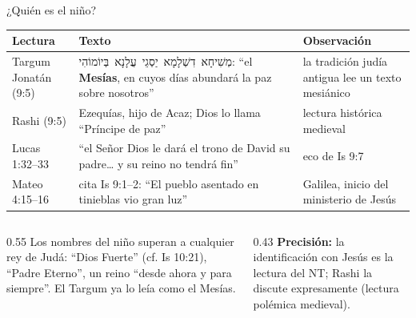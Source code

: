 \documentclass[hyperref={bookmarks=false},aspectratio=169]{beamer}
\newcommand{\heb}[1]{\mbox{\foreignlanguage{hebrew}{#1}}}
\newcommand{\destacar}[1]{\textbf{\textcolor{azul}{#1}}}
\newcommand{\precision}[1]{{\footnotesize\color{gris}\textbf{Precisión:} #1}}
\begin{document}
\begin{frame}{¿Quién es el niño?}
\scriptsize\renewcommand{\arraystretch}{1.2}
\begin{tabular}{@{}>{\RaggedRight\arraybackslash}p{2.6cm}>{\RaggedRight\arraybackslash}p{5.2cm}>{\RaggedRight\arraybackslash}p{4.0cm}@{}}
\toprule
\textbf{Lectura} & \textbf{Texto} & \textbf{Observación} \\ \midrule
Targum Jonatán (9:5) & \heb{מְשִׁיחָא דִשְׁלָמָא יַסְגֵי עֲלָנָא בְּיוֹמוֹהִי}: ``el \destacar{Mesías}, en cuyos días abundará la paz sobre nosotros'' & la tradición judía antigua lee un texto mesiánico \\
Rashi (9:5) & Ezequías, hijo de Acaz; Dios lo llama ``Príncipe de paz'' & lectura histórica medieval \\
Lucas 1:32--33 & ``el Señor Dios le dará el trono de David su padre\ldots{} y su reino no tendrá fin'' & eco de Is 9:7 \\
Mateo 4:15--16 & cita Is 9:1--2: ``El pueblo asentado en tinieblas vio gran luz'' & Galilea, inicio del ministerio de Jesús \\
\bottomrule
\end{tabular}\par\medskip
\begin{columns}[t,onlytextwidth]
\begin{column}{0.55\textwidth}\small
Los nombres del niño superan a cualquier rey de Judá: ``Dios Fuerte'' (cf. Is 10:21), ``Padre Eterno'', un reino ``desde ahora y para siempre''. El Targum ya lo leía como el Mesías.
\end{column}
\begin{column}{0.43\textwidth}
\precision{la identificación con Jesús es la lectura del NT; Rashi la discute expresamente (lectura polémica medieval).}
\end{column}
\end{columns}
\end{frame}
\end{document}
